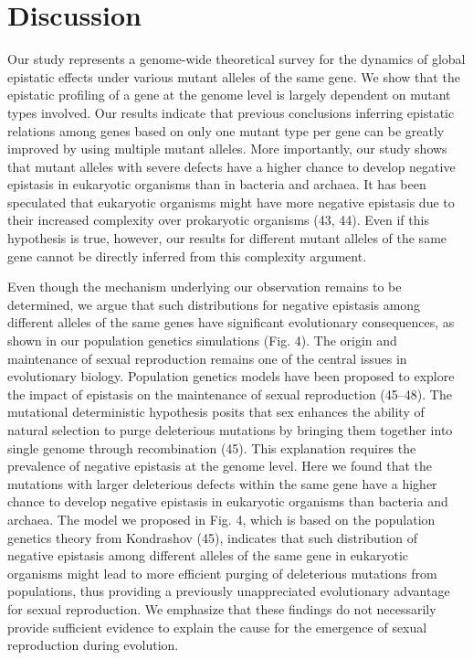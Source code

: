 \section{Discussion}
Our study represents a genome-wide theoretical survey for the dynamics
of global epistatic effects under various mutant alleles of the same
gene. We show that the epistatic profiling of a gene at the genome
level is largely dependent on mutant types involved. Our results
indicate that previous conclusions inferring epistatic relations among
genes based on only one mutant type per gene can be greatly improved
by using multiple mutant alleles. More importantly, our study shows
that mutant alleles with severe defects have a higher chance to
develop negative epistasis in eukaryotic organisms than in bacteria
and archaea. It has been speculated that eukaryotic organisms might
have more negative epistasis due to their increased complexity over
prokaryotic organisms (43, 44). Even if this hypothesis is true,
however, our results for different mutant alleles of the same gene
cannot be directly inferred from this complexity argument.

Even though the mechanism underlying our observation remains to be
determined, we argue that such distributions for negative epistasis
among different alleles of the same genes have significant
evolutionary consequences, as shown in our population genetics
simulations (Fig. 4). The origin and maintenance of sexual
reproduction remains one of the central issues in evolutionary
biology. Population genetics models have been proposed to explore the
impact of epistasis on the maintenance of sexual reproduction
(45–48). The mutational deterministic hypothesis posits that sex
enhances the ability of natural selection to purge deleterious
mutations by bringing them together into single genome through
recombination (45). This explanation requires the prevalence of
negative epistasis at the genome level. Here we found that the
mutations with larger deleterious defects within the same gene have a
higher chance to develop negative epistasis in eukaryotic organisms
than bacteria and archaea. The model we proposed in Fig. 4, which is
based on the population genetics theory from Kondrashov (45),
indicates that such distribution of negative epistasis among different
alleles of the same gene in eukaryotic organisms might lead to more
efficient purging of deleterious mutations from populations, thus
providing a previously unappreciated evolutionary advantage for sexual
reproduction. We emphasize that these findings do not necessarily
provide sufficient evidence to explain the cause for the emergence of
sexual reproduction during evolution.

